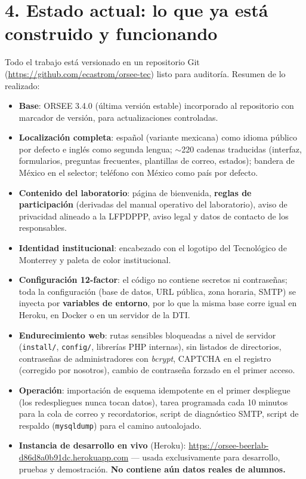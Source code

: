 \documentclass[11pt,letterpaper]{article}
\newcommand{\seccion}[1]{\section*{\color{tecblue}#1}}
\begin{document}
\seccion{4. Estado actual: lo que ya está construido y funcionando}

Todo el trabajo está versionado en un repositorio Git
(\url{https://github.com/ecastrom/orsee-tec}) listo para auditoría. Resumen de lo realizado:

\begin{itemize}[leftmargin=2em]
    \item \textbf{Base}: ORSEE 3.4.0 (última versión estable) incorporado al repositorio con
    marcador de versión, para actualizaciones controladas.
    \item \textbf{Localización completa}: español (variante mexicana) como idioma público por
    defecto e inglés como segunda lengua; $\sim$220 cadenas traducidas (interfaz, formularios,
    preguntas frecuentes, plantillas de correo, estados); bandera de México en el selector;
    teléfono con México como país por defecto.
    \item \textbf{Contenido del laboratorio}: página de bienvenida, \textbf{reglas de
    participación} (derivadas del manual operativo del laboratorio), aviso de privacidad
    alineado a la LFPDPPP, aviso legal y datos de contacto de los responsables.
    \item \textbf{Identidad institucional}: encabezado con el logotipo del Tecnológico de
    Monterrey y paleta de color institucional.
    \item \textbf{Configuración 12-factor}: el código no contiene secretos ni contraseñas;
    toda la configuración (base de datos, URL pública, zona horaria, SMTP) se inyecta por
    \textbf{variables de entorno}, por lo que la misma base corre igual en Heroku, en Docker
    o en un servidor de la DTI.
    \item \textbf{Endurecimiento web}: rutas sensibles bloqueadas a nivel de servidor
    (\texttt{install/}, \texttt{config/}, librerías PHP internas), sin listados de
    directorios, contraseñas de administradores con \emph{bcrypt}, CAPTCHA en el registro
    (corregido por nosotros), cambio de contraseña forzado en el primer acceso.
    \item \textbf{Operación}: importación de esquema idempotente en el primer despliegue
    (los redespliegues nunca tocan datos), tarea programada cada 10 minutos para la cola
    de correo y recordatorios, script de diagnóstico SMTP, script de respaldo
    (\texttt{mysqldump}) para el camino autoalojado.
    \item \textbf{Instancia de desarrollo en vivo} (Heroku):
    \url{https://orsee-beerlab-d86d8a0b91dc.herokuapp.com} --- usada exclusivamente para
    desarrollo, pruebas y demostración. \textbf{No contiene aún datos reales de alumnos.}
\end{itemize}
\end{document}

